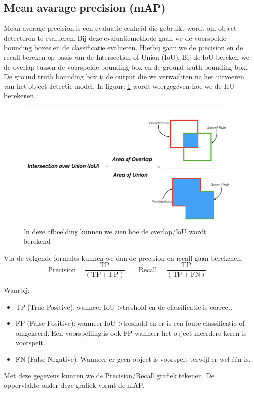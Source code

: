 \subsection{Mean avarage precision (mAP)} \label{map}
Mean average precision is een evaluatie eenheid die gebruikt wordt om object detectoren te evalueren.
Bij deze evaluatiemethode gaan we de voorspelde bounding boxes en de classificatie evalueren.
Hierbij gaan we de precision en de recall bereken op basis van de Intersection of Union (IoU).
Bij de IoU bereken we de overlap tussen de voorspelde bounding box en de ground truth bounding box.
De ground truth bounding box is de output die we verwachten na het uitvoeren van het object detectie model.
In figuur: \ref{fig:iou} wordt weergegeven hoe we de IoU berekenen.

\begin{figure}[!ht]
	\centering
	\includegraphics[width=0.80\linewidth]{fig/iou.png}
	\caption{In deze afbeelding kunnen we zien hoe de overlap/IoU wordt berekend}
	\label{fig:iou}
\end{figure}

Via de volgende formules kunnen we dan de precision en recall gaan berekenen.
\begin{equation}
	\textrm{Precision}  = \frac{\textrm{TP}}{(\textrm{TP} + \textrm{FP})} \qquad
	\textrm{Recall}  = \frac{\textrm{TP}}{(\textrm{TP} + \textrm{FN})}
\end{equation}

Waarbij:
\begin{itemize}
	\item TP (True Positive): wanneer IoU \textgreater treshold en de classificatie is correct.
	\item FP (False Positive): wanneer IoU \textgreater treshold en er is een foute classificatie of omgekeerd. Een voorspelling is ook FP wanneer het object meerdere keren is voorspelt.
	\item FN (False Negative): Wanneer er geen object is voorspelt terwijl er wel \'e\'en is.
\end{itemize}

Met deze gegevens kunnen we de Precision/Recall grafiek tekenen.
De oppervlakte onder deze grafiek vormt de mAP.

